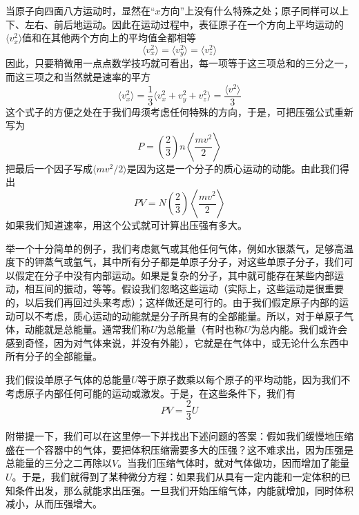当原子向四面八方运动时，显然在“$x$方向”上没有什么特殊之处；原子同样可以上下、左右、前后地运动。因此在运动过程中，表征原子在一个方向上平均运动的$\langle v_x^2 \rangle$值和在其他两个方向上的平均值全都相等
\begin{equation}
    \label{Eq:I:39:6}
    \langle v_x^2 \rangle = \langle v_y^2 \rangle = \langle v_z^2 \rangle 
\end{equation}
因此，只要稍微用一点点数学技巧就可看出，每一项等于这三项总和的三分之一，而这三项之和当然就是速率的平方
\begin{equation}
    \label{Eq:I:39:7}
    \langle v_x^2 \rangle = \frac{1}{3}\langle v_x^2 + v_y^2 + v_z^2 \rangle = \frac{\langle v^2 \rangle}{3}
\end{equation}
这个式子的方便之处在于我们毋须考虑任何特殊的方向，于是，可把压强公式重新写为
\begin{equation}
    \label{Eq:I:39:8}
    P = \left ( \frac{2}{3} \right )n \left \langle \frac{mv^2}{2} \right \rangle
\end{equation}
把最后一个因子写成$\langle mv^2/2 \rangle$是因为这是一个分子的质心运动的动能。由此我们得出
\begin{equation}
    \label{Eq:I:39:9}
    PV = N \left ( \frac{2}{3} \right )\left \langle \frac{mv^2}{2} \right \rangle
\end{equation}
如果我们知道速率，用这个公式就可计算出压强有多大。

举一个十分简单的例子，我们考虑氦气或其他任何气体，例如水银蒸气，足够高温度下的钾蒸气或氩气，其中所有分子都是单原子分子，对这些单原子分子，我们可以假定在分子中没有内部运动。如果是复杂的分子，其中就可能存在某些内部运动，相互间的振动，等等。假设我们忽略这些运动（实际上，这些运动是很重要的，以后我们再回过头来考虑）；这样做还是可行的。由于我们假定原子内部的运动可以不考虑，质心运动的动能就是分子所具有的全部能量。所以，对于单原子气体，动能就是总能量。通常我们称$U$为总能量（有时也称$U$为总内能。我们或许会感到奇怪，因为对气体来说，并没有外能），它就是在气体中，或无论什么东西中所有分子的全部能量。

我们假设单原子气体的总能量$U$等于原子数乘以每个原子的平均动能，因为我们不考虑原子内部任何可能的运动或激发。于是，在这些条件下，我们有
\begin{equation}
    \label{Eq:I:39:10}
    PV = \frac{2}{3}U
\end{equation}

附带提一下，我们可以在这里停一下并找出下述问题的答案：假如我们缓慢地压缩盛在一个容器中的气体，要把体积压缩需要多大的压强？这不难求出，因为压强是总能量的三分之二再除以$V$。当我们压缩气体时，就对气体做功，因而增加了能量$U$。于是，我们就得到了某种微分方程：如果我们从具有一定内能和一定体积的已知条件出发，那么就能求出压强。一旦我们开始压缩气体，内能就增加，同时体积减小，从而压强增大。

